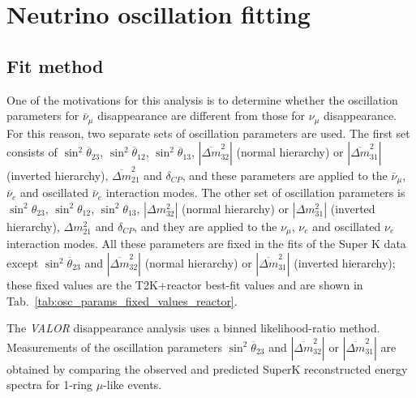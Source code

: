 \clearpage

\section {Neutrino oscillation fitting}
\label{sec:oscfit}

\subsection {Fit method}
\label{sec:oscfit_method}

One of the motivations for this analysis is to determine whether the oscillation parameters for $\bar{\nu}_{\mu}$ disappearance are different 
from those for $\nu_{\mu}$ disappearance. For this reason, two separate sets of oscillation parameters are used. The first set consists of  
$\sin^{2}\overline{\theta}_{23}$, $\sin^{2}\overline{\theta}_{12}$, $\sin^{2}\overline{\theta}_{13}$, $|\overline{\Delta m}^{2}_{32}|$ 
(normal hierarchy) or $|\overline{\Delta m}^{2}_{31}|$ (inverted hierarchy), 
$\overline{\Delta m}^{2}_{21}$ and $\delta_{CP}$, and these parameters are 
applied to the $\bar{\nu}_{\mu}$, $\bar{\nu}_{e}$ and oscillated $\bar{\nu}_{e}$ interaction modes. The other set of oscillation parameters is 
$\sin^{2}\theta_{23}$, $\sin^{2}\theta_{12}$, $\sin^{2}\theta_{13}$, $|\Delta m^{2}_{32}|$ 
(normal hierarchy) or $|\Delta m^{2}_{31}|$ (inverted hierarchy),
$\Delta m^{2}_{21}$ and $\delta_{CP}$, and they are applied to the $\nu_{\mu}$, $\nu_{e}$ and oscillated $\nu_{e}$
interaction modes. All these parameters are fixed in the fits of the Super K data except $\sin^{2}\overline{\theta}_{23}$ 
and $|\overline{\Delta m}^{2}_{32}|$ 
(normal hierarchy) or $|\overline{\Delta m}^{2}_{31}|$ (inverted hierarchy); 
these fixed values are the T2K+reactor best-fit values and are shown in Tab.~\ref{tab:osc_params_fixed_values_reactor}.



The {\em VALOR} disappearance analysis uses a binned likelihood-ratio method.
Measurements of the oscillation parameters $\sin^{2}\overline{\theta}_{23}$ and $|\overline{\Delta m}^{2}_{32}|$ 
or $|\overline{\Delta m}^{2}_{31}|$
are obtained by comparing the observed and predicted SuperK reconstructed energy spectra
for 1-ring $\mu$-like events.

